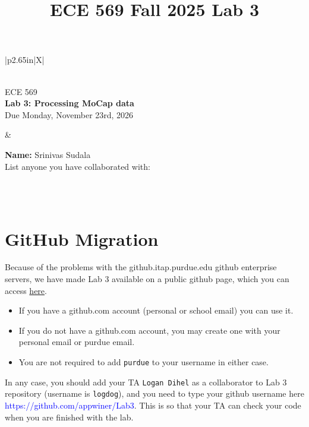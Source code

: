 \documentclass{article}
\title{ECE 569 Fall 2025 Lab 3}
\numberwithin{figure}{section}
\begin{document}

\noindent
\begin{tabularx}{\linewidth}{|p{2.65in}|X|}
\hline
	\begin{minipage}{\linewidth}
	~\\
	
	{\Large ECE 569} \\
	{\bf Lab 3: Processing MoCap data} \\
	{Due Monday, November 23rd, 2026}	
	~\\
	\end{minipage}
	&
	\begin{minipage}{\linewidth}
	{\bf Name:} Srinivas Sudala \vspace{0.5em} \\
	List anyone you have collaborated with:
	\\
	~\\	
	\end{minipage}
\\
\hline
\end{tabularx}

\section*{GitHub Migration}

Because of the problems with the github.itap.purdue.edu github enterprise servers, we have made Lab 3 available on a public github page, which you can access \href{https://github.com/purdue-ece569-fall2025/Lab3}{here}.
\begin{itemize}
    \item If you have a github.com account (personal or school email) you can use it.
    \item If you do not have a github.com account, you may create one with your personal email or purdue email.
    \item You are not required to add \verb|purdue| to your username in either case.
\end{itemize}

In any case, you should add your TA \verb|Logan Dihel| as a collaborator to Lab 3 repository (username is \verb|logdog|), and you need to type your github username here \textcolor{blue}{https://github.com/appwiner/Lab3}. This is so that your TA can check your code when you are finished with the lab.
\end{document}
